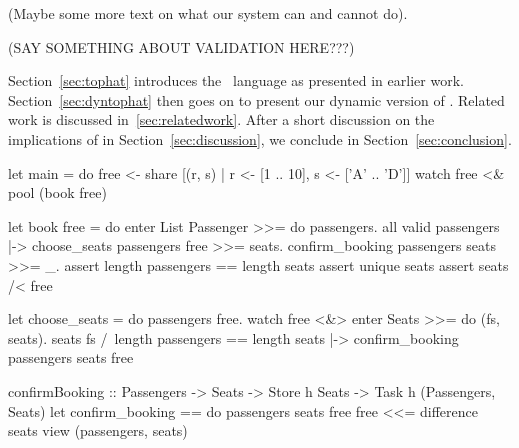 (Maybe some more text on what our system can and cannot do).

(SAY SOMETHING ABOUT VALIDATION HERE???)

Section~\ref{sec:tophat} introduces the \TOPHAT\ language as presented in earlier work. Section~\ref{sec:dyntophat} then goes on to present our dynamic version of \TOPHAT.
Related work is discussed in~\ref{sec:relatedwork}. After a short discussion on the implications of \DYNTOPHAT in Section~\ref{sec:discussion}, we conclude in Section~\ref{sec:conclusion}.

\begin{TASK}[emph={passengers,seats,free}]
  let main = do
    free <- share [(r, s) | r <- [1 .. 10], s <- ['A' .. 'D']]
    watch free <& pool (book free)

  let book free = do
    enter List Passenger >>= do passengers.
      all valid passengers |->
        choose_seats passengers free >>= seats.
        confirm_booking passengers seats >>= _.
        assert length passengers == length seats
        assert unique seats
        assert seats /< free

  let choose_seats = do passengers free.
    watch free <&> enter Seats >>= do (fs, seats).
    seats fs /\ length passengers == length seats
      |-> confirm_booking passengers seats free

  confirmBooking :: Passengers -> Seats -> Store h Seats -> Task h (Passengers, Seats)
  let confirm_booking == do passengers seats free
    free <<= difference seats
    view (passengers, seats)
\end{TASK}




